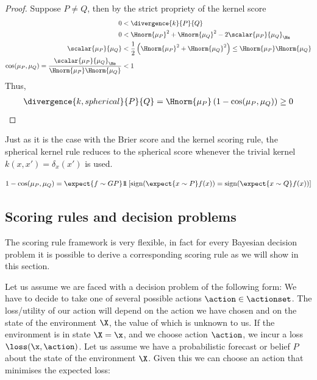 \begin{theorem} 
\begin{proof}
	Suppose $P\neq Q$, then by the strict propriety of the kernel score
	\begin{align}
		0 &< \divergence{k}{P}{Q}\\
		0 &< \Hnorm{\mu_P}^2 + \Hnorm{\mu_Q}^2 - 2\scalar{\mu_P}{\mu_Q} _{\He}\\
		\scalar{\mu_P}{\mu_Q} &< \frac{1}{2}\left(\Hnorm{\mu_P}^2 + \Hnorm{\mu_Q}^2\right) \leq \Hnorm{\mu_P}\Hnorm{\mu_Q}\\
		\cos(\mu_P,\mu_Q) = \frac{\scalar{\mu_P}{\mu_Q} _{\He}}{\Hnorm{\mu_P}\Hnorm{\mu_Q}} &< 1
	\end{align}
	Thus,
	\begin{align}
		\divergence{k,spherical}{P}{Q} = \Hnorm{\mu_P} \left( 1 - \cos(\mu_P, \mu_Q)\right) \geq 0
	\end{align}
\end{proof}
\end{theorem}

Just as it is the case with the Brier score and the kernel scoring rule, the spherical kernel rule reduces to the spherical score whenever the trivial kernel $k(x,x') = \delta_{x}(x')$ is used.


\begin{equation}
	1 - \cos(\mu_P,\mu_Q) = \expect{f\sim GP} 1\!\!1\left[ \mbox{sign}(\expect{x\sim P} f(x)) = \mbox{sign}(\expect{x\sim Q} f(x)) \right]
\end{equation}

\subsection{Scoring rules  and decision problems}

The scoring rule framework is very flexible, in fact for every Bayesian decision problem it is possible to derive a corresponding scoring rule as we will show in this section.

Let us assume we are faced with a decision problem of the following form: We have to decide to take one of several possible actions $\action\in\actionset$. The loss/utility of our action will depend on the action we have chosen and on the state of the environment $\X$, the value of which is unknown to us. If the environment is in state $\X=\x$, and we choose action $\action$, we incur a loss $\loss(\x,\action)$.
Let us assume we have a probabilistic forecast or belief $P$ about the state of the environment $\X$. Given this we can choose an action that minimises the expected loss:

